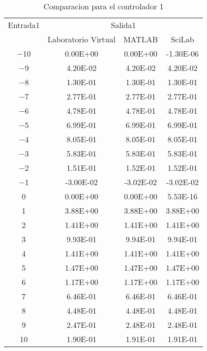         {\setlength\LTleft{0pt}
        \setlength\LTright{0pt}
        \centering
        \renewcommand{\arraystretch}{0.89}
        \begin{longtable}{c @{\extracolsep{\fill}} ccc}
        \caption[Comparacion de diseño de controladores difusos - controlador 1]{Comparacion para el controlador 1} 
        \label{tab:C1Difuso} \\
        \toprule
        Entrada1  &        \multicolumn{3}{c}{Salida1}        \\ \cmidrule{1-1} \cmidrule{2-4}
                  &   Laboratorio Virtual  & MATLAB & SciLab  \\ \cmidrule{2-2} \cmidrule{3-3} \cmidrule{4-4}
        \endhead
        \bottomrule
        \endfoot
        \num{-10} & \num{0.00E+00}  & \num{0.00E+00}  & \num{-1.30E-06}  \\
        \num{-9}  & \num{4.20E-02}  & \num{4.20E-02}  & \num{4.20E-02}   \\
        \num{-8}  & \num{1.30E-01}  & \num{1.30E-01}  & \num{1.30E-01}   \\
        \num{-7}  & \num{2.77E-01}  & \num{2.77E-01}  & \num{2.77E-01}   \\
        \num{-6}  & \num{4.78E-01}  & \num{4.78E-01}  & \num{4.78E-01}   \\
        \num{-5}  & \num{6.99E-01}  & \num{6.99E-01}  & \num{6.99E-01}   \\
        \num{-4}  & \num{8.05E-01}  & \num{8.05E-01}  & \num{8.05E-01}   \\
        \num{-3}  & \num{5.83E-01}  & \num{5.83E-01}  & \num{5.83E-01}   \\
        \num{-2}  & \num{1.51E-01}  & \num{1.52E-01}  & \num{1.52E-01}   \\
        \num{-1}  & \num{-3.00E-02} & \num{-3.02E-02} & \num{-3.02E-02}  \\
        \num{0}   & \num{0.00E+00}  & \num{0.00E+00}  & \num{5.53E-16}   \\
        \num{1}   & \num{3.88E+00}  & \num{3.88E+00}  & \num{3.88E+00}   \\
        \num{2}   & \num{1.41E+00}  & \num{1.41E+00}  & \num{1.41E+00}   \\
        \num{3}   & \num{9.93E-01}  & \num{9.94E-01}  & \num{9.94E-01}   \\
        \num{4}   & \num{1.41E+00}  & \num{1.41E+00}  & \num{1.41E+00}   \\
        \num{5}   & \num{1.47E+00}  & \num{1.47E+00}  & \num{1.47E+00}   \\
        \num{6}   & \num{1.17E+00}  & \num{1.17E+00}  & \num{1.17E+00}   \\
        \num{7}   & \num{6.46E-01}  & \num{6.46E-01}  & \num{6.46E-01}   \\
        \num{8}   & \num{4.48E-01}  & \num{4.48E-01}  & \num{4.48E-01}   \\
        \num{9}   & \num{2.47E-01}  & \num{2.48E-01}  & \num{2.48E-01}   \\
        \num{10}  & \num{1.90E-01}  & \num{1.91E-01}  & \num{1.91E-01}   \\
        \end{longtable}}


